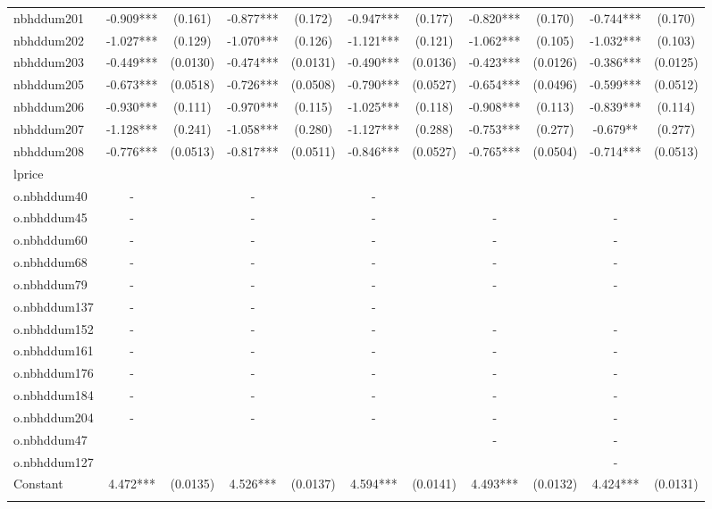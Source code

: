 \documentclass[]{article}
\begin{document}
\begin{tabular}{lcccccccccc}
nbhddum201 & -0.909*** & (0.161) & -0.877*** & (0.172) & -0.947*** & (0.177) & -0.820*** & (0.170) & -0.744*** & (0.170) \\
nbhddum202 & -1.027*** & (0.129) & -1.070*** & (0.126) & -1.121*** & (0.121) & -1.062*** & (0.105) & -1.032*** & (0.103) \\
nbhddum203 & -0.449*** & (0.0130) & -0.474*** & (0.0131) & -0.490*** & (0.0136) & -0.423*** & (0.0126) & -0.386*** & (0.0125) \\
nbhddum205 & -0.673*** & (0.0518) & -0.726*** & (0.0508) & -0.790*** & (0.0527) & -0.654*** & (0.0496) & -0.599*** & (0.0512) \\
nbhddum206 & -0.930*** & (0.111) & -0.970*** & (0.115) & -1.025*** & (0.118) & -0.908*** & (0.113) & -0.839*** & (0.114) \\
nbhddum207 & -1.128*** & (0.241) & -1.058*** & (0.280) & -1.127*** & (0.288) & -0.753*** & (0.277) & -0.679** & (0.277) \\
nbhddum208 & -0.776*** & (0.0513) & -0.817*** & (0.0511) & -0.846*** & (0.0527) & -0.765*** & (0.0504) & -0.714*** & (0.0513) \\
lprice &  &  &  &  &  &  &  &  &  &  \\
o.nbhddum40 & - &  & - &  & - &  &  &  &  &  \\
o.nbhddum45 & - &  & - &  & - &  & - &  & - &  \\
o.nbhddum60 & - &  & - &  & - &  & - &  & - &  \\
o.nbhddum68 & - &  & - &  & - &  & - &  & - &  \\
o.nbhddum79 & - &  & - &  & - &  & - &  & - &  \\
o.nbhddum137 & - &  & - &  & - &  &  &  &  &  \\
o.nbhddum152 & - &  & - &  & - &  & - &  & - &  \\
o.nbhddum161 & - &  & - &  & - &  & - &  & - &  \\
o.nbhddum176 & - &  & - &  & - &  & - &  & - &  \\
o.nbhddum184 & - &  & - &  & - &  & - &  & - &  \\
o.nbhddum204 & - &  & - &  & - &  & - &  & - &  \\
o.nbhddum47 &  &  &  &  &  &  & - &  & - &  \\
o.nbhddum127 &  &  &  &  &  &  &  &  & - &  \\
Constant & 4.472*** & (0.0135) & 4.526*** & (0.0137) & 4.594*** & (0.0141) & 4.493*** & (0.0132) & 4.424*** & (0.0131) \\
 &  &  &  &  &  &  &  &  &  &  \\

\end{tabular}
\end{document}
